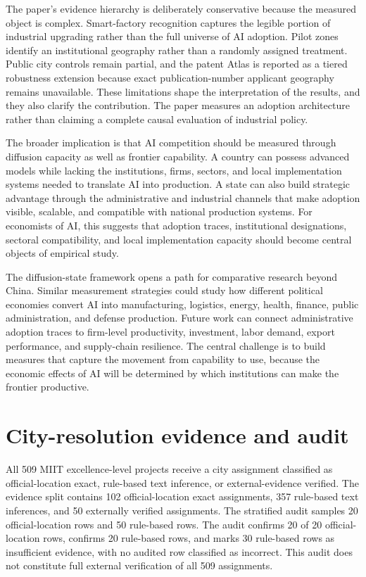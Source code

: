 \documentclass[12pt]{article}
\begin{document}
The paper's evidence hierarchy is deliberately conservative because the measured object is complex. Smart-factory recognition captures the legible portion of industrial upgrading rather than the full universe of AI adoption. Pilot zones identify an institutional geography rather than a randomly assigned treatment. Public city controls remain partial, and the patent Atlas is reported as a tiered robustness extension because exact publication-number applicant geography remains unavailable. These limitations shape the interpretation of the results, and they also clarify the contribution. The paper measures an adoption architecture rather than claiming a complete causal evaluation of industrial policy.

The broader implication is that AI competition should be measured through diffusion capacity as well as frontier capability. A country can possess advanced models while lacking the institutions, firms, sectors, and local implementation systems needed to translate AI into production. A state can also build strategic advantage through the administrative and industrial channels that make adoption visible, scalable, and compatible with national production systems. For economists of AI, this suggests that adoption traces, institutional designations, sectoral compatibility, and local implementation capacity should become central objects of empirical study.

The diffusion-state framework opens a path for comparative research beyond China. Similar measurement strategies could study how different political economies convert AI into manufacturing, logistics, energy, health, finance, public administration, and defense production. Future work can connect administrative adoption traces to firm-level productivity, investment, labor demand, export performance, and supply-chain resilience. The central challenge is to build measures that capture the movement from capability to use, because the economic effects of AI will be determined by which institutions can make the frontier productive.

\newpage
\appendix

\section{City-resolution evidence and audit}
\label{app:geo_audit}

All 509 MIIT excellence-level projects receive a city assignment classified as official-location exact, rule-based text inference, or external-evidence verified. The evidence split contains 102 official-location exact assignments, 357 rule-based text inferences, and 50 externally verified assignments. The stratified audit samples 20 official-location rows and 50 rule-based rows. The audit confirms 20 of 20 official-location rows, confirms 20 rule-based rows, and marks 30 rule-based rows as insufficient evidence, with no audited row classified as incorrect. This audit does not constitute full external verification of all 509 assignments.
\end{document}
